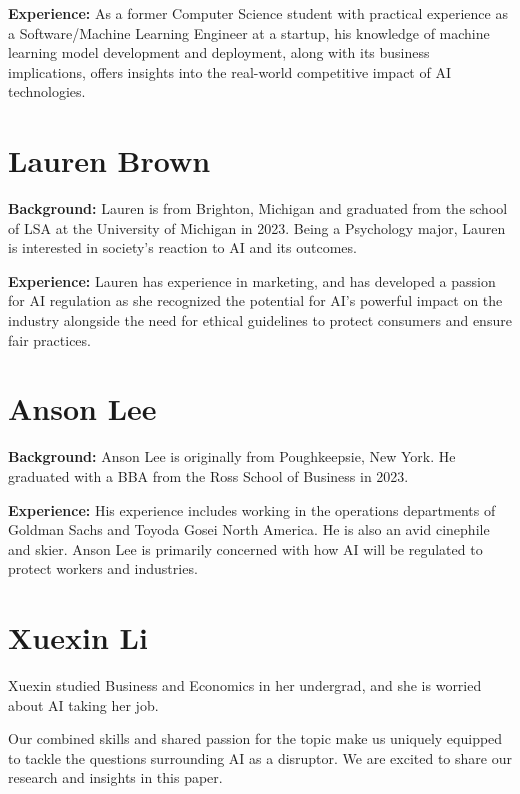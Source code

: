 \documentclass[
]{book}
\begin{document}
\textbf{Experience:}
As a former Computer Science student with practical experience as a Software/Machine Learning Engineer at a startup, his knowledge of machine learning model development and deployment, along with its business implications, offers insights into the real-world competitive impact of AI technologies.

\hypertarget{lauren-brown}{%
\section{Lauren Brown}\label{lauren-brown}}

\textbf{Background:}
Lauren is from Brighton, Michigan and graduated from the school of LSA at the University of Michigan in 2023. Being a Psychology major, Lauren is interested in society's reaction to AI and its outcomes.

\textbf{Experience:}
Lauren has experience in marketing, and has developed a passion for AI regulation as she recognized the potential for AI's powerful impact on the industry alongside the need for ethical guidelines to protect consumers and ensure fair practices.

\hypertarget{anson-lee}{%
\section{Anson Lee}\label{anson-lee}}

\textbf{Background:}
Anson Lee is originally from Poughkeepsie, New York. He graduated with a BBA from the Ross School of Business in 2023.

\textbf{Experience:}
His experience includes working in the operations departments of Goldman Sachs and Toyoda Gosei North America. He is also an avid cinephile and skier. Anson Lee is primarily concerned with how AI will be regulated to protect workers and industries.

\hypertarget{xuexin-li}{%
\section{Xuexin Li}\label{xuexin-li}}

Xuexin studied Business and Economics in her undergrad, and she is worried about AI taking her job.

Our combined skills and shared passion for the topic make us uniquely equipped to tackle the questions surrounding AI as a disruptor. We are excited to share our research and insights in this paper.
\end{document}
